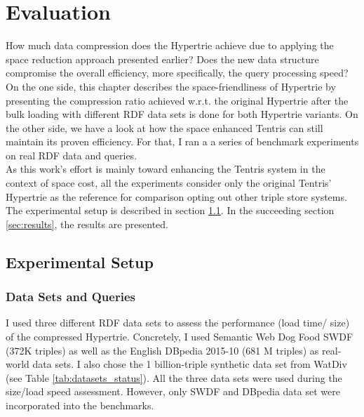 \chapter{Evaluation}
\label{ch:evaluation}

How much data compression does the Hypertrie achieve due to applying the space reduction approach presented earlier? 
Does the new data structure compromise the overall efficiency, more specifically, the query processing speed? 
On the one side, this chapter describes the space-friendliness of Hypertrie by presenting the compression ratio achieved w.r.t. the original Hypertrie after the bulk loading with different RDF data sets is done for both Hypertrie variants.  
On the other side, we have a look at how the space enhanced Tentris can still maintain its proven efficiency. For that, I ran a a series of benchmark experiments on real RDF data and queries. \\

As this work's effort is mainly toward enhancing the Tentris system in the context of space cost, all the experiments consider only the original Tentris' Hypertrie as the reference for comparison opting out other triple store systems. The experimental setup is described in section \ref{sec:exper_setup}. In the succeeding section \ref{sec:results}, the results are presented.

\section{Experimental Setup}
\label{sec:exper_setup}

\subsection{Data Sets and Queries}
\label{subsec:datasets}

 I used three different RDF data sets to assess the performance  (load time/ size) of the compressed Hypertrie. Concretely, I used Semantic Web Dog Food SWDF (372K triples) as well as the English DBpedia 2015-10 (681 M triples) as real-world data sets. 
I also chose the 1 billion-triple synthetic data set from WatDiv \cite{WatDiv} (see Table \ref{tab:datasets_status}). All the three data sets were used during the size/load speed assessment. However, only SWDF and DBpedia data set were incorporated into the benchmarks.

